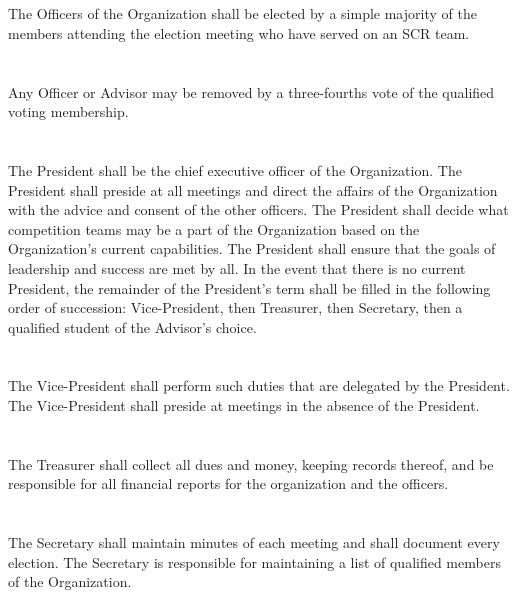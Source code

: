 \documentclass[12pt]{cls/constitution}
\begin{document}
\section{}
The Officers of the Organization shall be elected by a simple majority of the members attending the election meeting who have served on an SCR team.

\section{}
Any Officer or Advisor may be removed by a three-fourths vote of the qualified voting membership. 

\section{}
The President shall be the chief executive officer of the Organization.  The President shall preside at all meetings and direct the affairs of the Organization with the advice and consent of the other officers.  The President shall decide what competition teams may be a part of the Organization based on the Organization’s current capabilities. The President shall ensure that the goals of leadership and success are met by all. In the event that there is no current President, the remainder of the President’s term shall be filled in the following order of succession:  Vice-President, then Treasurer, then Secretary, then a qualified student of the Advisor’s choice.

\section{}
The Vice-President shall perform such duties that are delegated by the President.  The Vice-President shall preside at meetings in the absence of the President. 

\section{}
The Treasurer shall collect all dues and money, keeping records thereof, and be responsible for all financial reports for the organization and the officers.

\section{}
The Secretary shall maintain minutes of each meeting and shall document every election. The Secretary is responsible for maintaining a list of qualified members of the Organization.
\end{document}
